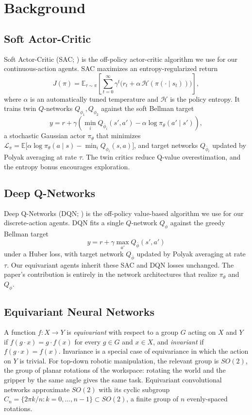 \documentclass[letterpaper]{article}
\begin{document}
\section{Background}

\subsection{Soft Actor-Critic}
Soft Actor-Critic (SAC; \citealp{haarnoja2018sac}) is the off-policy actor-critic algorithm we use for our continuous-action agents. SAC maximizes an entropy-regularized return
\begin{equation}
J(\pi) = \mathbb{E}_{\tau \sim \pi}\!\left[ \sum_{t=0}^{\infty} \gamma^{t} \big( r_t + \alpha \, \mathcal{H}(\pi(\cdot \mid s_t)) \big) \right],
\end{equation}
where $\alpha$ is an automatically tuned temperature and $\mathcal{H}$ is the policy entropy. It trains twin $Q$-networks $Q_{\phi_1}, Q_{\phi_2}$ against the soft Bellman target
\begin{equation}
y = r + \gamma \left( \min_{i} Q_{\bar\phi_i}(s', a') - \alpha \log \pi_\theta(a' \mid s') \right),
\end{equation}
a stochastic Gaussian actor $\pi_\theta$ that minimizes $\mathcal{L}_\pi = \mathbb{E}\big[ \alpha \log \pi_\theta(a \mid s) - \min_i Q_{\phi_i}(s, a) \big]$, and target networks $Q_{\bar\phi_i}$ updated by Polyak averaging at rate $\tau$. The twin critics reduce Q-value overestimation, and the entropy bonus encourages exploration.

\subsection{Deep Q-Networks}
Deep Q-Networks (DQN; \citealp{mnih2015dqn}) is the off-policy value-based algorithm we use for our discrete-action agents. DQN fits a single $Q$-network $Q_\phi$ against the greedy Bellman target
\begin{equation}
y = r + \gamma \max_{a'} Q_{\bar\phi}(s', a')
\end{equation}
under a Huber loss, with target network $Q_{\bar\phi}$ updated by Polyak averaging at rate $\tau$. Our equivariant agents inherit these SAC and DQN losses unchanged. The paper's contribution is entirely in the network architectures that realize $\pi_\theta$ and $Q_\phi$.

\subsection{Equivariant Neural Networks}
A function $f \colon X \to Y$ is \emph{equivariant} with respect to a group $G$ acting on $X$ and $Y$ if $f(g \cdot x) = g \cdot f(x)$ for every $g \in G$ and $x \in X$, and \emph{invariant} if $f(g \cdot x) = f(x)$. Invariance is a special case of equivariance in which the action on $Y$ is trivial. For top-down robotic manipulation, the relevant group is $SO(2)$, the group of planar rotations of the workspace: rotating the world and the gripper by the same angle gives the same task. Equivariant convolutional networks approximate $SO(2)$ with its cyclic subgroup $C_n = \{2\pi k/n : k = 0, \dots, n-1\} \subset SO(2)$, a finite group of $n$ evenly-spaced rotations.
\end{document}
